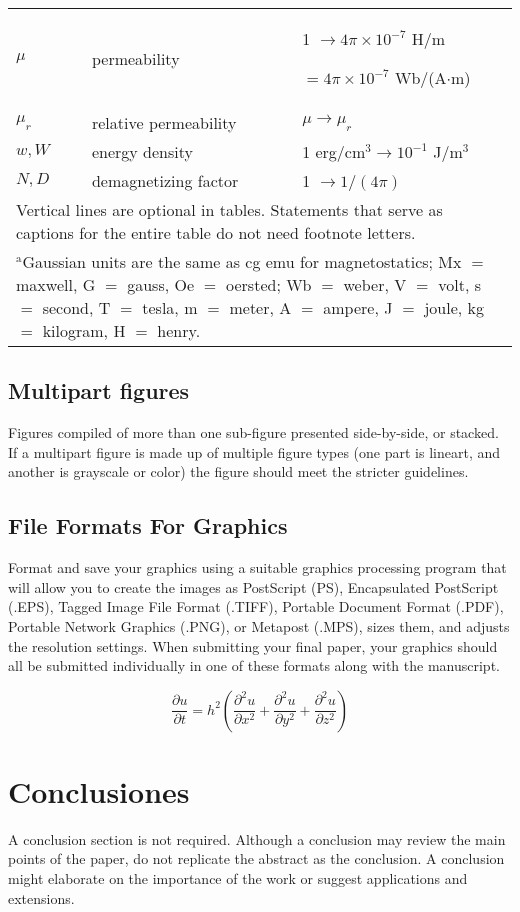 \documentclass[a4paper]{IEEEtran} %
\begin{document}
\begin{table}
\begin{tabular}{|p{25pt}|p{75pt}|p{115pt}|}
$\mu $& 
permeability& 
1 $\to  4\pi \times  10^{-7}$ H/m \par $= 4\pi \times  10^{-7}$ Wb/(A$\cdot $m) \\
$\mu_{r}$& 
relative permeability& 
$\mu \to \mu_{r}$ \\
$w, W$& 
energy density& 
1 erg/cm$^{3} \to  10^{-1}$ J/m$^{3}$ \\
$N, D$& 
demagnetizing factor& 
1 $\to  1/(4\pi )$ \\
\hline
\multicolumn{3}{p{251pt}}{Vertical lines are optional in tables. Statements that serve as captions for 
the entire table do not need footnote letters. }\\
\multicolumn{3}{p{251pt}}{$^{\mathrm{a}}$Gaussian units are the same as cg emu for magnetostatics; Mx 
$=$ maxwell, G $=$ gauss, Oe $=$ oersted; Wb $=$ weber, V $=$ volt, s $=$ 
second, T $=$ tesla, m $=$ meter, A $=$ ampere, J $=$ joule, kg $=$ 
kilogram, H $=$ henry.}
\end{tabular}
\label{tab1}
\end{table}

\subsection{Multipart figures}
Figures compiled of more than one sub-figure presented side-by-side, or 
stacked. If a multipart figure is made up of multiple figure
types (one part is lineart, and another is grayscale or color) the figure 
should meet the stricter guidelines.

\subsection{File Formats For Graphics}\label{formats}
Format and save your graphics using a suitable graphics processing program 
that will allow you to create the images as PostScript (PS), Encapsulated 
PostScript (.EPS), Tagged Image File Format (.TIFF), Portable Document 
Format (.PDF), Portable Network Graphics (.PNG), or Metapost (.MPS), sizes them, and adjusts 
the resolution settings. When 
submitting your final paper, your graphics should all be submitted 
individually in one of these formats along with the manuscript.

\begin{equation}
\frac{\partial u}{\partial t}
   = h^2 \left( \frac{\partial^2 u}{\partial x^2}
      + \frac{\partial^2 u}{\partial y^2}
      + \frac{\partial^2 u}{\partial z^2} \right)
\end{equation}


\section{Conclusiones}
A conclusion section is not required. Although a conclusion may review the 
main points of the paper, do not replicate the abstract as the conclusion. A 
conclusion might elaborate on the importance of the work or suggest 
applications and extensions. 




\end{document}
